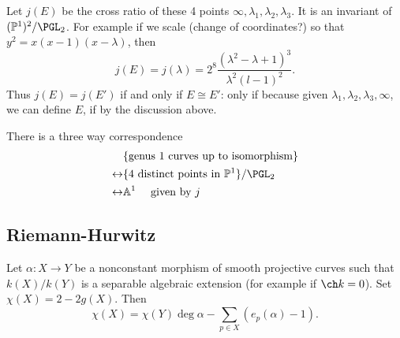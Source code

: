 \documentclass[a4paper]{article}
\renewcommand{\A}{\mathbb{A}}
\renewcommand*{\P}{\mathbb{P}}
\begin{document}
Let \(j(E)\) be the cross ratio of these 4 points \(\infty, \lambda_1, \lambda_2, \lambda_3\). It is an invariant of \((\P^1)^2/\PGL_2\). For example if we scale (change of coordinates?) so that \(y^2 = x(x - 1)(x - \lambda)\), then
\[
  j(E) = j(\lambda) = 2^8 \frac{(\lambda^2 - \lambda + 1)^3}{\lambda^2 (l - 1)^2}.
\]
Thus \(j(E) = j(E')\) if and only if \(E \cong E'\): only if because given \(\lambda_1, \lambda_2, \lambda_3, \infty\), we can define \(E\), if by the discussion above.

\begin{corollary}
  There is a three way correspondence
  \begin{align*}
    &\{\text{genus 1 curves up to isomorphism}\} \\
    \leftrightarrow & \{4 \text{ distinct points in } \P^1\}/\PGL_2 \\
    \leftrightarrow & \A^1 \quad \text{ given by } j
  \end{align*}
\end{corollary}

\subsection{Riemann-Hurwitz}

\begin{theorem}
  Let \(\alpha: X \to Y\) be a nonconstant morphism of smooth projective curves such that \(k(X)/k(Y)\) is a separable algebraic extension (for example if \(\ch k = 0\)). Set \(\chi(X) = 2 - 2g(X)\). Then
  \[
    \chi(X) = \chi(Y) \deg \alpha - \sum_{p \in X} (e_p(\alpha) - 1).
  \]
\end{theorem}
\end{document}

